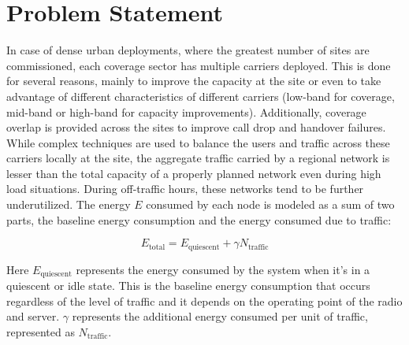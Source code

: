 \section{Problem Statement}
\label{sec:ps}

In case of dense urban deployments, where the greatest number of sites are commissioned, each coverage sector has multiple carriers deployed. 
This is done for several reasons, mainly to improve the capacity at the site or even to take advantage of different characteristics of different carriers (low-band for coverage, mid-band or high-band for capacity improvements). 
Additionally, coverage overlap is provided across the sites to improve call drop and handover failures. 
While complex techniques are used to balance the users and traffic across these carriers locally at the site, the aggregate traffic carried by a regional network is lesser than the total capacity of a properly planned network even during high load situations. 
During off-traffic hours, these networks tend to be further underutilized. The energy $E$ consumed by each node is modeled as a sum of two parts, the baseline energy consumption and the energy consumed due to traffic:

\begin{equation}
    E_{\text{total}} = E_{\text{quiescent}} + \gamma N_{\text{traffic}}
\end{equation}

Here $E_{\text{quiescent}}$ represents the energy consumed by the system when it's in a quiescent or idle state. 
This is the baseline energy consumption that occurs regardless of the level of traffic and it depends on the operating point of the radio and server.
$\gamma$ represents the additional energy consumed per unit of traffic, represented as $N_{\text{traffic}}$.

